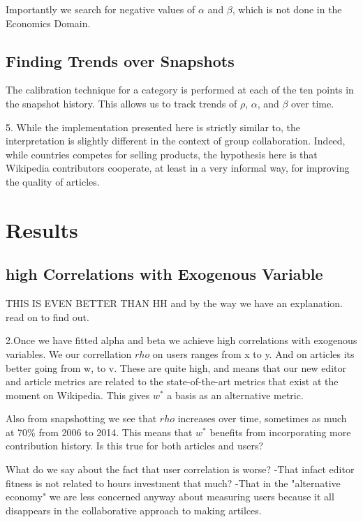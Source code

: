 \documentclass{acm_proc_article-sp}
\begin{document}
Importantly we search for negative values of $\alpha$ and $\beta$, which is not done in the Economics Domain.

\subsection{Finding Trends over Snapshots}

The calibration technique for a category is performed at each of the ten points in the snapshot history. This allows us to track trends of $\rho$, $\alpha$, and $\beta$ over time.



5. While the implementation presented here is strictly similar to, the interpretation is slightly different in the context of group collaboration. Indeed, while countries competes for selling products, the hypothesis here is that Wikipedia contributors cooperate, at least in a very informal way, for improving the quality of articles.




\section{Results}


\subsection{high Correlations with Exogenous Variable}

THIS IS EVEN BETTER THAN HH
and by the way we have an explanation. read on to find out.

2.Once we have fitted alpha and beta we achieve high correlations with exogenous variables. We our correllation $rho$ 
 on users ranges from x to y. And on articles its better going from w, to v. These are quite high, and means that our new editor and article metrics are related to the state-of-the-art metrics that exist at the moment on Wikipedia. This gives $w^*$ a basis as an alternative metric. 
 
 Also from snapshotting we see that $rho$ increases over time, sometimes as much at 70\% from 2006 to 2014. This means that $w^*$ benefits from incorporating more contribution history.
Is this true for both articles and users?

What do we say about the fact that user correlation is worse?
-That infact editor fitness is not related to hours investment that much?
-That in the "alternative economy" we are less concerned anyway about measuring users because it all disappears in the collaborative approach to making artilces. 
 
\end{document}
